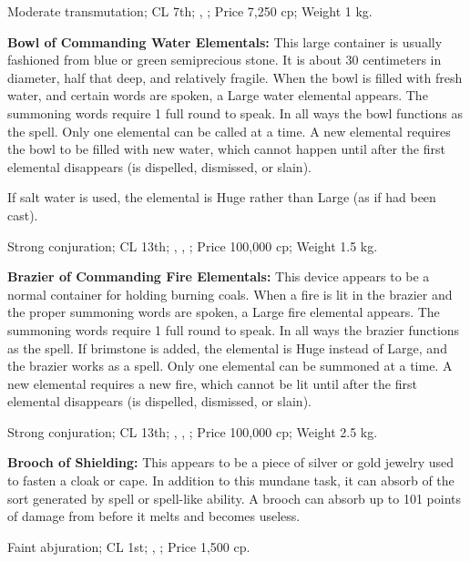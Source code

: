 Moderate transmutation; CL 7th; , ; Price 7,250 cp; Weight 1 kg.



\textbf{Bowl of Commanding Water Elementals:} This large container is usually fashioned from blue or green semiprecious stone. It is about 30 centimeters in diameter, half that deep, and relatively fragile. When the bowl is filled with fresh water, and certain words are spoken, a Large water elemental appears. The summoning words require 1 full round to speak. In all ways the bowl functions as the  spell. Only one elemental can be called at a time. A new elemental requires the bowl to be filled with new water, which cannot happen until after the first elemental disappears (is dispelled, dismissed, or slain).

If salt water is used, the elemental is Huge rather than Large (as if  had been cast).

Strong conjuration; CL 13th; , , ; Price 100,000 cp; Weight 1.5 kg.



\textbf{Brazier of Commanding Fire Elementals:} This device appears to be a normal container for holding burning coals. When a fire is lit in the brazier and the proper summoning words are spoken, a Large fire elemental appears. The summoning words require 1 full round to speak. In all ways the brazier functions as the  spell. If brimstone is added, the elemental is Huge instead of Large, and the brazier works as a  spell. Only one elemental can be summoned at a time. A new elemental requires a new fire, which cannot be lit until after the first elemental disappears (is dispelled, dismissed, or slain).

Strong conjuration; CL 13th; , , ; Price 100,000 cp; Weight 2.5 kg.



\textbf{Brooch of Shielding:} This appears to be a piece of silver or gold jewelry used to fasten a cloak or cape. In addition to this mundane task, it can absorb  of the sort generated by spell or spell-like ability. A brooch can absorb up to 101 points of damage from  before it melts and becomes useless.

Faint abjuration; CL 1st; , ; Price 1,500 cp.



